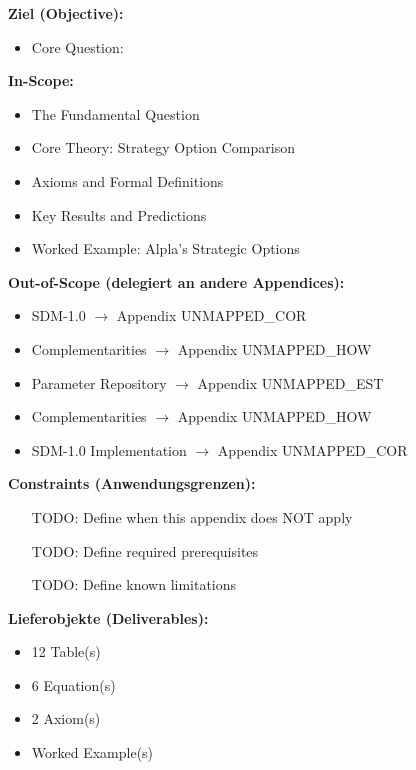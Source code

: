 \begin{tcolorbox}[
    colback=orange!5!white,
    colframe=orange!75!black,
    title={\textbf{Appendix Scope: Ziel / In-Scope / Out-of-Scope / Constraints}},
    fonttitle=\bfseries
]

\textbf{Ziel (Objective):}
\begin{itemize}[nosep]
    \item Core Question:
\end{itemize}

\textbf{In-Scope:}
\begin{itemize}[nosep]
    \item The Fundamental Question
    \item Core Theory: Strategy Option Comparison
    \item Axioms and Formal Definitions
    \item Key Results and Predictions
    \item Worked Example: Alpla's Strategic Options
\end{itemize}

\textbf{Out-of-Scope (delegiert an andere Appendices):}
\begin{itemize}[nosep]
    \item SDM-1.0 $\rightarrow$ Appendix UNMAPPED_COR
    \item Complementarities $\rightarrow$ Appendix UNMAPPED_HOW
    \item Parameter Repository $\rightarrow$ Appendix UNMAPPED_EST
    \item Complementarities $\rightarrow$ Appendix UNMAPPED_HOW
    \item SDM-1.0 Implementation $\rightarrow$ Appendix UNMAPPED_COR
\end{itemize}

\textbf{Constraints (Anwendungsgrenzen):}
\begin{itemize}[nosep]
    \item [TODO: Define when this appendix does NOT apply]
    \item [TODO: Define required prerequisites]
    \item [TODO: Define known limitations]
\end{itemize}

\textbf{Lieferobjekte (Deliverables):}
\begin{itemize}[nosep]
    \item 12 Table(s)
    \item 6 Equation(s)
    \item 2 Axiom(s)
    \item Worked Example(s)
\end{itemize}

\end{tcolorbox}


